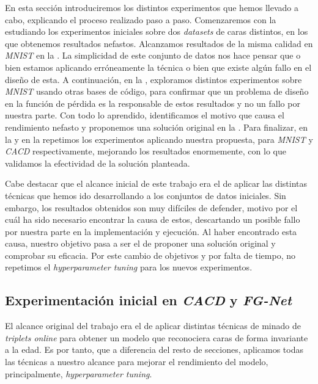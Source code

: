 En esta sección introduciremos los distintos experimentos que hemos llevado a cabo, explicando el proceso realizado paso a paso. Comenzaremos con la  estudiando los experimentos iniciales sobre dos \textit{datasets} de caras distintos, en los que obtenemos resultados nefastos. Alcanzamos resultados de la misma calidad en \textit{MNIST} en la . La simplicidad de este conjunto de datos nos hace pensar que o bien estamos aplicando erróneamente la técnica o bien que existe algún fallo en el diseño de esta. A continuación, en la , exploramos distintos experimentos sobre \textit{MNIST} usando otras bases de código, para confirmar que un problema de diseño en la función de pérdida es la responsable de estos resultados y no un fallo por nuestra parte. Con todo lo aprendido, identificamos el motivo que causa el rendimiento nefasto y proponemos una solución original en la . Para finalizar, en la  y en la  repetimos los experimentos aplicando nuestra propuesta, para \textit{MNIST} y \textit{CACD} respectivamente, mejorando los resultados enormemente, con lo que validamos la efectividad de la solución planteada.

Cabe destacar que el alcance inicial de este trabajo era el de aplicar las distintas técnicas que hemos ido desarrollando a los conjuntos de datos iniciales. Sin embargo, los resultados obtenidos son muy difíciles de defender, motivo por el cuál ha sido necesario encontrar la causa de estos, descartando un posible fallo por nuestra parte en la implementación y ejecución. Al haber encontrado esta causa, nuestro objetivo pasa a ser el de proponer una solución original y comprobar su eficacia. Por este cambio de objetivos y por falta de tiempo, no repetimos el \textit{hyperparameter tuning} para los nuevos experimentos.

\subsection{Experimentación inicial en \textit{CACD} y \textit{FG-Net}} \label{isubsec:experimentacion_inicial}

El alcance original del trabajo era el de aplicar distintas técnicas de minado de \textit{triplets online} para obtener un modelo que reconociera caras de forma invariante a la edad. Es por tanto, que a diferencia del resto de secciones, aplicamos todas las técnicas a nuestro alcance para mejorar el rendimiento del modelo, principalmente, \textit{hyperparameter tuning}.

